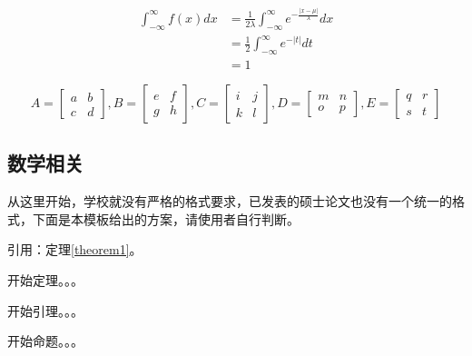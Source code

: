 \begin{equation}
	\begin{aligned}
		\int_{−\infty}^{\infty}f(x)dx & = \frac{1}{2\lambda}\int_{−\infty}^{\infty}e^{−\frac{|x−\mu|}{\lambda}}dx \\
		& = \frac{1}{2}\int_{−\infty}^{\infty}e^{−|t|}dt \\
		& = 1
	\end{aligned}
\end{equation}

\[
A = \begin{bmatrix}
	a & b \\
	c & d
\end{bmatrix},
B = \begin{bmatrix}
	e & f \\
	g & h
\end{bmatrix},
C = \begin{bmatrix}
	i & j \\
	k & l
\end{bmatrix},
D = \begin{bmatrix}
	m & n \\
	o & p
\end{bmatrix},
E = \begin{bmatrix}
	q & r \\
	s & t
\end{bmatrix}
\]


\subsection{数学相关}

从这里开始，学校就没有严格的格式要求，已发表的硕士论文也没有一个统一的格式，下面是本模板给出的方案，请使用者自行判断。

引用：定理\ref{theorem1}。

\begin{theorem}
	\label{theorem1}
	
	开始定理。。。
\end{theorem}

\begin{lemma}
	\label{lemma1}
	开始引理。。。
\end{lemma}

\begin{proposition}
	\label{proposition1}
	开始命题。。。
\end{proposition}

